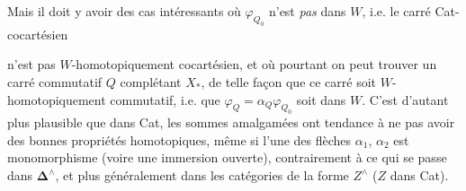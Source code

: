 Mais il doit y avoir des cas intéressants où $\varphi_{Q_0}$ n'est \textit{pas} dans $W$, i.e. le carré Cat-cocartésien
n'est pas $W$-homotopiquement cocartésien, et où pourtant on peut trouver un carré commutatif $Q$
complétant $X_*$, de telle façon que ce carré soit $W$-homotopiquement commutatif, i.e. que $\varphi_Q = \alpha_Q \varphi_{Q_0}$ soit dans $W$. C'est d'autant plus plausible que dans Cat, les sommes amalgamées ont tendance à ne pas avoir des bonnes propriétés homotopiques, même si l'une des flèches $\alpha_1$, $\alpha_2$ est monomorphisme (voire une immersion ouverte), contrairement à ce qui se passe dans $\boldsymbol{\Delta}^\wedge$, et plus généralement dans les catégories de la forme $Z^\wedge$ ($Z$ dans Cat).

